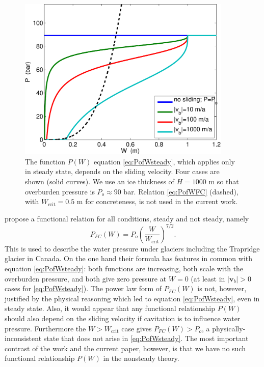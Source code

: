 \documentclass[11pt,final]{amsart}%
\newcommand\bv{\mathbf{v}}
\begin{document}
\begin{figure}[ht]
\centering
\includegraphics[width=4.0in,keepaspectratio=true]{figs/psteady}
\bigskip
\caption{The function $P(W)$ equation \eqref{eq:PofWsteady}, which applies only in steady state, depends on the sliding velocity.  Four cases are shown (solid curves).  We use an ice thickness of $H=1000$ m so that overburden pressure is $P_o \approx 90$ bar.  Relation \eqref{eq:PofWFC} (dashed), with $W_{\text{crit}}=0.5$ m for concreteness, is not used in the current work.}
\label{fig:psteady}
\end{figure}

\cite{FlowersClarke2002_theory} propose a functional relation for all conditions, steady and not steady, namely
\begin{equation}
P_{FC}(W) = P_o \left(\frac{W}{W_{\text{crit}}}\right)^{7/2}. \label{eq:PofWFC}
\end{equation}
This is used to describe the water pressure under glaciers including the Trapridge glacier in Canada.  On the one hand their formula has features in common with equation \eqref{eq:PofWsteady}: both functions are increasing, both scale with the overburden pressure, and both give zero pressure at $W=0$ (at least in $|\bv_b|>0$ cases for \eqref{eq:PofWsteady}).  The power law form of $P_{FC}(W)$ is not, however, justified by the physical reasoning which led to equation \eqref{eq:PofWsteady}, even in steady state.  Also, it would appear that any functional relationship $P(W)$ should also depend on the sliding velocity if cavitation is to influence water pressure.  Furthermore the $W>W_{\text{crit}}$ case gives $P_{FC}(W) > P_o$, a physically-inconsistent state that does not arise in \eqref{eq:PofWsteady}.  The most important contrast of the \cite{FlowersClarke2002_theory} work and the current paper, however, is that we have no such functional relationship $P(W)$ in the nonsteady theory.
\end{document}
